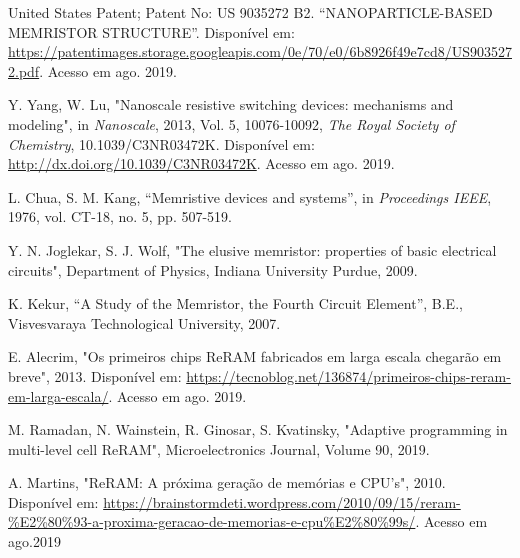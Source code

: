 \documentclass{ceel}
\begin{document}
\begin{multicols}{2}
\begin{thebibliography}{9}
    United States Patent; Patent No: US 9035272 B2. “NANOPARTICLE-BASED MEMRISTOR STRUCTURE”. Disponível em: \url{https://patentimages.storage.googleapis.com/0e/70/e0/6b8926f49e7cd8/US9035272.pdf}. Acesso em ago. 2019.
    

Y. Yang, W. Lu,
"Nanoscale resistive switching devices: mechanisms and modeling",
in \emph{Nanoscale},
2013, Vol. 5, 10076-10092, \emph{The Royal Society of Chemistry}, 10.1039/C3NR03472K. 
Disponível em: \url{http://dx.doi.org/10.1039/C3NR03472K}. Acesso em ago. 2019.

    L. Chua, S. M. Kang,
    “Memristive devices and systems”, 
    in \emph{Proceedings IEEE}, 1976, vol. CT-18, no. 5, pp. 507-519.

    Y. N. Joglekar, S. J. Wolf, "The elusive memristor: properties of basic electrical circuits", Department of Physics, Indiana University Purdue, 2009.

    K. Kekur,
    “A Study of the Memristor, the Fourth Circuit Element”, 
   B.E., Visvesvaraya Technological University, 2007.




   E. Alecrim, "Os primeiros chips ReRAM fabricados em larga escala chegarão em breve", 2013. Disponível em: \url{https://tecnoblog.net/136874/primeiros-chips-reram-em-larga-escala/}. Acesso em ago. 2019.
   
    M. Ramadan, N. Wainstein, R. Ginosar, S. Kvatinsky, "Adaptive programming in multi-level cell ReRAM", Microelectronics Journal, Volume 90, 2019. %
    
A. Martins, "ReRAM: A próxima geração de memórias e CPU's", 2010. Disponível em: \url{https://brainstormdeti.wordpress.com/2010/09/15/reram-\%E2\%80\%93-a-proxima-geracao-de-memorias-e-cpu\%E2\%80\%99s/}. Acesso em ago.2019



\end{thebibliography}


\end{multicols}
\end{document}
